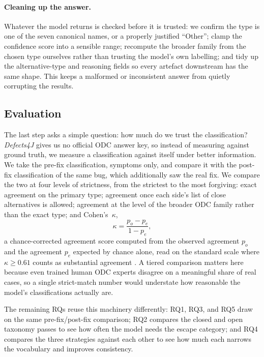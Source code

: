 \paragraph{Cleaning up the answer.}
Whatever the model returns is checked before it is trusted: we confirm the type
is one of the seven canonical names, or a properly justified ``Other''; clamp the
confidence score into a sensible range; recompute the broader family from the
chosen type ourselves rather than trusting the model's own labelling; and tidy up
the alternative-type and reasoning fields so every artefact downstream has the
same shape. This keeps a malformed or inconsistent answer from quietly
corrupting the results.

\subsection{Evaluation}
\label{sec:eval}

The last step asks a simple question: how much do we trust the classification?
\textit{Defects4J} gives us no official ODC answer key, so instead of measuring
against ground truth, we measure a classification against itself under better
information. We take the pre-fix classification, symptoms only, and compare it
with the post-fix classification of the same bug, which additionally saw the
real fix. We compare the two at four levels of strictness, from the strictest
to the most
forgiving: exact agreement on the primary type; agreement once each side's list
of close alternatives is allowed; agreement at the level of the broader ODC
family rather than the exact type; and Cohen's~$\kappa$,
\begin{equation}
  \kappa = \frac{p_o - p_e}{1 - p_e},
  \label{eq:kappa}
\end{equation}
a chance-corrected agreement score computed from the observed agreement $p_o$ and
the agreement $p_e$ expected by chance alone, read on the standard scale where
$\kappa \ge 0.61$ counts as substantial agreement \citep{landis1977measurement}.
A tiered comparison matters here because even trained human ODC experts disagree
on a meaningful share of real cases, so a single strict-match number would
understate how reasonable the model's classifications actually are.

The remaining RQs reuse this machinery differently: RQ1, RQ3, and RQ5
draw on the same pre-fix/post-fix comparison; RQ2 compares the closed and open
taxonomy passes to see how often the model needs the escape category; and RQ4
compares the three strategies against each other to see how much each narrows
the vocabulary and improves consistency.

